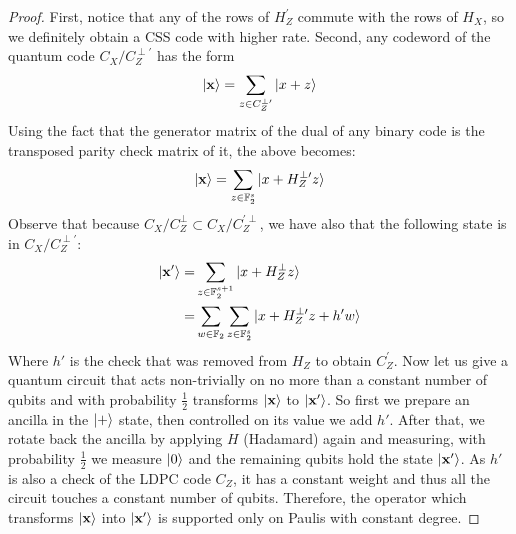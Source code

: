 \documentclass[manuscript,screen,review]{acmart}
\begin{document}
\begin{proof}
First, notice that any of the rows of $H_Z^{\prime}$ commute with the rows of $H_X$, so we definitely obtain a CSS code with higher rate. Second, any codeword of the quantum code $C_X/C_Z^{\perp \prime}$ has the form  
\begin{equation*}
  \begin{split}
    \ket{\mathbf{x}} = \sum_{z \in C_Z^{\perp \prime}}{\ket{x + z}}
  \end{split}
\end{equation*}
Using the fact that the generator matrix of the dual of any binary code is the transposed parity check matrix of it, the above becomes:
\begin{equation*}
  \begin{split}
    \ket{\mathbf{x}} = \sum_{z \in \mathbb{F}_2^s}{\ket{x + H_Z^{\perp \prime}z}}
  \end{split}
\end{equation*}
Observe that because $C_X/C_Z^{\perp} \subset C_X/C_Z^{\prime \perp}$, we have also that the following state is in $C_X/C_Z^{\perp \prime}$:
\begin{equation*}
  \begin{split} 
    \ket{\mathbf{x'}} = & \sum_{z \in \mathbb{F}_2^{s+1}}{\ket{x + H_Z^{\perp}z}} \\
      =& \sum_{w \in \mathbb{F}_2}\sum_{z \in \mathbb{F}_2^s}{\ket{x + H_Z^{\perp \prime}z + h'w  }}
  \end{split}
\end{equation*}
Where $h'$ is the check that was removed from $H_Z$ to obtain $C_Z^{\prime}$. Now let us give a quantum circuit that acts non-trivially on no more than a constant number of qubits and with probability $\frac{1}{2}$ transforms $\ket{\mathbf{x}}$ to $\ket{\mathbf{x'}}$. So first we prepare an ancilla in the $\ket{+}$ state, then controlled on its value we add $h'$. After that, we rotate back the ancilla by applying $H$ (Hadamard) again and measuring, with probability $\frac{1}{2}$ we measure $\ket{0}$ and the remaining qubits hold the state $\ket{\mathbf{x'}}$. As $h'$ is also a check of the LDPC code $C_Z$, it has a constant weight and thus all the circuit touches a constant number of qubits. Therefore, the operator which transforms $\ket{\mathbf{x}}$ into $\ket{\mathbf{x'}}$ is supported only on Paulis with constant degree.     
\end{proof}

% 

\printbibliography
\end{document}
